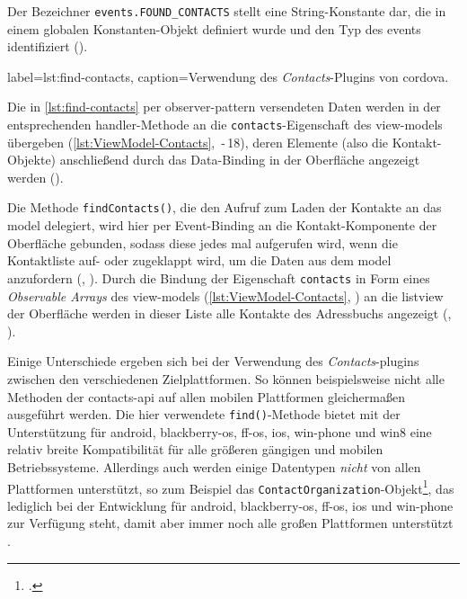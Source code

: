 Der Bezeichner \lstinline|events.FOUND_CONTACTS| stellt eine String-Konstante dar, die in einem globalen Konstanten-Objekt definiert wurde und den Typ des \glspl{event} identifiziert ().

	 { label=lst:find-contacts, caption={Verwendung des \emph{Contacts}-Plugins von \gls{cordova}.}}

Die in \autoref{lst:find-contacts} per \gls{observer-pattern} versendeten Daten werden in der entsprechenden \gls{handler}-Methode an die \lstinline|contacts|-Eigenschaft des \glspl{view-model} übergeben (\autoref{lst:ViewModel-Contacts}, \,-\,18), deren Elemente (also die Kontakt-Objekte) anschließend durch das Data-Binding in der Oberfläche angezeigt werden (\su).


Die Methode \lstinline|findContacts()|, die den Aufruf zum Laden der Kontakte an das \gls{model} delegiert, wird hier per Event-Binding an die Kontakt-Komponente der Oberfläche gebunden, sodass diese jedes mal aufgerufen wird, wenn die Kontaktliste auf- oder zugeklappt wird, um die Daten aus dem \gls{model} anzufordern (, ).
Durch die Bindung der Eigenschaft \lstinline|contacts| in Form eines \emph{Observable Arrays} des \glspl{view-model} (\autoref{lst:ViewModel-Contacts}, ) an die \gls{listview} der Oberfläche werden in dieser Liste alle Kontakte des Adressbuchs angezeigt (, ).

	
		
Einige Unterschiede ergeben sich bei der Verwendung des \emph{Contacts}-\glspl{plugin} zwischen den verschiedenen Zielplattformen.
So können beispielsweise nicht alle Methoden der \gls{contacts-api} auf allen mobilen Plattformen gleichermaßen ausgeführt werden.
Die hier verwendete \lstinline|find()|-Methode bietet mit der Unterstützung für \gls{android}, \gls{blackberry-os}, \gls{ff-os}, \gls{ios}, \gls{win-phone} und \gls{win8} eine relativ  breite Kompatibilität für alle größeren gängigen und mobilen Betriebssysteme.
Allerdings auch werden einige Datentypen \emph{nicht} von allen Plattformen unterstützt, so zum Beispiel das \lstinline|ContactOrganization|-Objekt\footnote{.}, das lediglich bei der Entwicklung für \gls{android}, \gls{blackberry-os}, \gls{ff-os}, \gls{ios} und \gls{win-phone} zur Verfügung steht, damit aber immer noch alle großen Plattformen unterstützt \cite{Cordova_Plugin_Registry_Contacts}.

